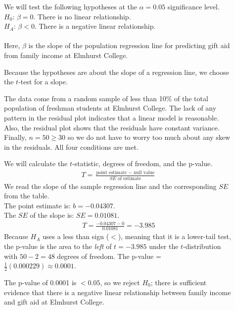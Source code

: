 \begin{examplewrap}
\begin{nexample}
\begin{description}
\item[]  We will test the following hypotheses at the $\alpha=0.05$ significance level.\\
$H_0$: $\beta = 0$. There is no linear relationship.\\
$H_A$: $\beta < 0$. There is a negative linear relationship.  
\\
\\
Here, $\beta$ is the slope of the population regression line for predicting gift aid from family income at Elmhurst College.
\item[] Because the hypotheses are about the slope of a regression line, we choose the $t$-test for a slope.  
\item[]  The data come from a random sample of less than 10\% of the total population of freshman students at Elmhurst College.  The lack of any pattern in the residual plot indicates that a linear model is reasonable. Also, the residual plot shows that the residuals have constant variance. Finally, $n=50\ge 30$ so we do not have to worry too much about any skew in the residuals.  All four conditions are met.
\item[]  We will calculate the $t$-statistic, degrees of freedom, and the p-value.
\begin{align*}
T = \frac{\text{point estimate } - \text{ null value}}{SE \text{ of estimate}}
\end{align*}
We read the slope of the sample regression line and the corresponding $SE$ from the table.
\\
The point estimate is: $b = -0.04307$.
\\
The $SE$ of the slope is: $SE = 0.01081$.  
\begin{align*}
T = \frac{-0.04307 - 0}{0.01081} = -3.985
\end{align*}
Because $H_A$ uses a less than sign ($<$), meaning that it is a lower-tail test, the \mbox{p-value} is the area to the \emph{left} of $t=-3.985$ under the $t$-distribution with $50-2=48$ degrees of freedom.  The p-value = $\frac{1}{2}(0.000229)\approx 0.0001$.  
\item[]  The p-value of 0.0001 is $< 0.05$, so we reject $H_0$; there is sufficient evidence that there is a negative linear relationship between family income and gift aid at Elmhurst College.  
\end{description}


\end{nexample}
\end{examplewrap}
\label{overallAidIncomeInformalAssessmentOfRegressionLineSlope}

